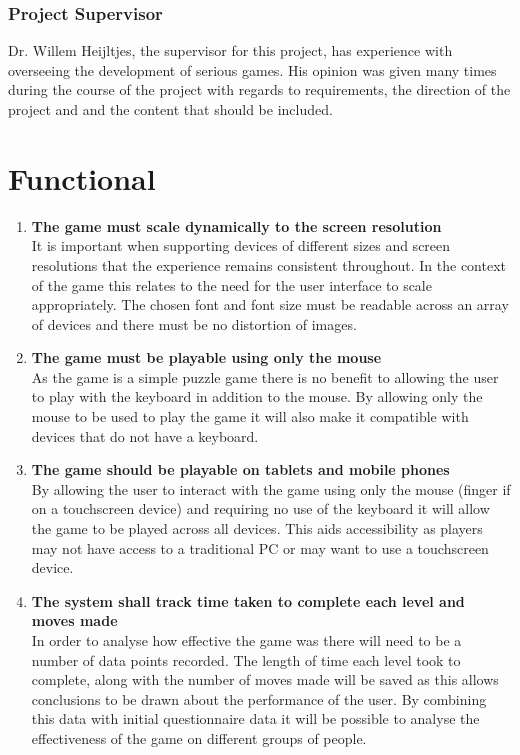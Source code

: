 \documentclass[12pt,a4paper]{report}
\begin{document}
\subsubsection{Project Supervisor}
Dr. Willem Heijltjes, the supervisor for this project, has experience with overseeing the development of serious games. His opinion was given many times during the course of the project with regards to requirements, the direction of the project and and the content that should be included.

 \section{Functional}
   \begin{enumerate}[label*=\arabic*]
   
   
   
   
            \item \textbf{The game must scale dynamically to the screen resolution}\\
It is important when supporting devices of different sizes and screen resolutions that the experience remains consistent throughout. In the context of the game this relates to the need for the user interface to scale appropriately. The chosen font and font size must be readable across an array of devices and there must be no distortion of images.


            \item \textbf{The game must be playable using only the mouse}\\
As the game is a simple puzzle game there is no benefit to allowing the user to play with the keyboard in addition to the mouse. By allowing only the mouse to be used to play the game it will also make it compatible with devices that do not have a keyboard.

 \item \textbf{The game should be playable on tablets and mobile phones}\\
By allowing the user to interact with the game using only the mouse (finger if on a touchscreen device) and requiring no use of the keyboard it will allow the game to be played across all devices. This aids accessibility as players may not have access to a traditional PC or may want to use a touchscreen device.	

            	  \item \textbf{The system shall track time taken to complete each level and moves made}\\
In order to analyse how effective the game was there will need to be a number of data points recorded. The length of time each level took to complete, along with the number of moves made will be saved as this allows conclusions to be drawn about the performance of the user. By combining this data with initial questionnaire data it will be possible to analyse the effectiveness of the game on different groups of people.
            

\end{enumerate}
\end{document}
